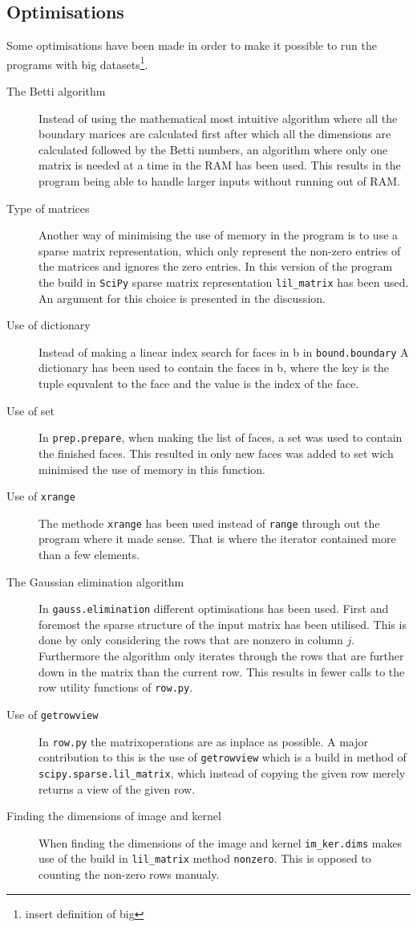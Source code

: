 \documentclass[11pt,a4paper,twoside]{report}
\begin{document}
\subsection{Optimisations}
Some optimisations have been made in order to make it possible to run the programs with big datasets\footnote{insert definition of big}.
\begin{description}
\item[The Betti algorithm] Instead of using the mathematical most intuitive algorithm where all the boundary marices are calculated first after which all the dimensions are calculated followed by the Betti numbers, an algorithm where only one matrix is needed at a time in the RAM has been used. This results in the program being able to handle larger inputs without running out of RAM.
\item[Type of matrices] Another way of minimising the use of memory in the program is to use a sparse matrix representation, which only represent the non-zero entries of the matrices and ignores the zero entries. In this version of the program the build in \texttt{SciPy} sparse matrix representation \texttt{lil\_matrix} has been used. An argument for this choice is presented in the discussion.
\item[Use of dictionary] Instead of making a linear index search for faces in b in \texttt{bound.boundary} A dictionary has been used to contain the faces in b, where the key is the tuple equvalent to the face and the value is the index of the face.
\item[Use of set] In \texttt{prep.prepare}, when making the list of faces, a set was used to contain the finished faces. This resulted in only new faces was added to set wich minimised the use of memory in this function.
\item[Use of \texttt{xrange}] The methode \texttt{xrange} has been used instead of \texttt{range} through out the program where it made sense. That is where the iterator contained more than a few elements.
\item[The Gaussian elimination algorithm] In \texttt{gauss.elimination} different optimisations has been used. First and foremost the sparse structure of the input matrix has been utilised. This is done by only considering the rows that are nonzero in column $j$. Furthermore the algorithm only iterates through the rows that are further down in the matrix than the current row. This results in fewer calls to the row utility functions of \texttt{row.py}.
\item[Use of \texttt{getrowview}] In \texttt{row.py} the matrixoperations are as inplace as possible. A major contribution to this is the use of \texttt{getrowview} which is a build in method of \texttt{scipy.sparse.lil\_matrix}, which instead of copying the given row merely returns a view of the given row. 
\item[Finding the dimensions of image and kernel] When finding the dimensions of the image and kernel \texttt{im\_ker.dims} makes use of the build in \texttt{lil\_matrix} method \texttt{nonzero}. This is opposed to counting the non-zero rows manualy.
\end{description}
\end{document}
